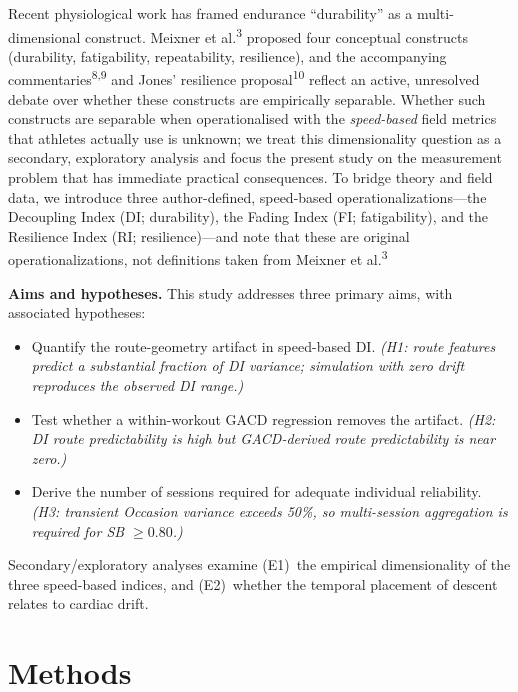\documentclass[12pt]{article}
\begin{document}
Recent physiological work has framed endurance ``durability'' as a
multi-dimensional construct. Meixner et al.\textsuperscript{3} proposed
four conceptual constructs (durability, fatigability, repeatability,
resilience), and the accompanying commentaries\textsuperscript{8,9} and
Jones' resilience proposal\textsuperscript{10} reflect an active,
unresolved debate over whether these constructs are empirically
separable. Whether such constructs are separable when operationalised
with the \emph{speed-based} field metrics that athletes actually use is
unknown; we treat this dimensionality question as a secondary,
exploratory analysis and focus the present study on the measurement
problem that has immediate practical consequences. To bridge theory and
field data, we introduce three author-defined, speed-based
operationalizations---the Decoupling Index (DI; durability), the Fading
Index (FI; fatigability), and the Resilience Index (RI; resilience)---and
note that these are original operationalizations, not definitions taken
from Meixner et al.\textsuperscript{3}

\noindent\textbf{Aims and hypotheses.} This study addresses three primary
aims, with associated hypotheses:
\begin{itemize}
  \item[\textbf{A1}] Quantify the route-geometry artifact in speed-based
  DI. \emph{(H1: route features predict a substantial fraction of DI
  variance; simulation with zero drift reproduces the observed DI range.)}
  \item[\textbf{A2}] Test whether a within-workout GACD regression removes
  the artifact. \emph{(H2: DI route predictability is high but GACD-derived
  route predictability is near zero.)}
  \item[\textbf{A3}] Derive the number of sessions required for adequate
  individual reliability. \emph{(H3: transient Occasion variance exceeds
  50\%, so multi-session aggregation is required for SB $\geq 0.80$.)}
\end{itemize}
Secondary/exploratory analyses examine (E1)~the empirical dimensionality
of the three speed-based indices, and (E2)~whether the temporal placement
of descent relates to cardiac drift.

\section{Methods}
\end{document}
